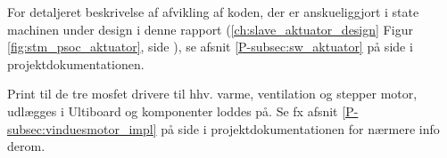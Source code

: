 For detaljeret beskrivelse af afvikling af koden, der er anskueliggjort i state machinen under design i denne rapport (\ref{ch:slave_aktuator_design}  Figur \ref{fig:stm_psoc_aktuator}, side \pageref{fig:stm_psoc_aktuator}), se afsnit \ref{P-subsec:sw_aktuator}  på side \pageref{P-subsec:sw_aktuator} i projektdokumentationen.

Print til de tre mosfet drivere til hhv. varme, ventilation og stepper motor, udlægges i Ultiboard og komponenter loddes på. 
Se fx afsnit \ref{P-subsec:vinduesmotor_impl}  på side \pageref{P-subsec:vinduesmotor_impl} i projektdokumentationen for nærmere info derom.

\clearpage